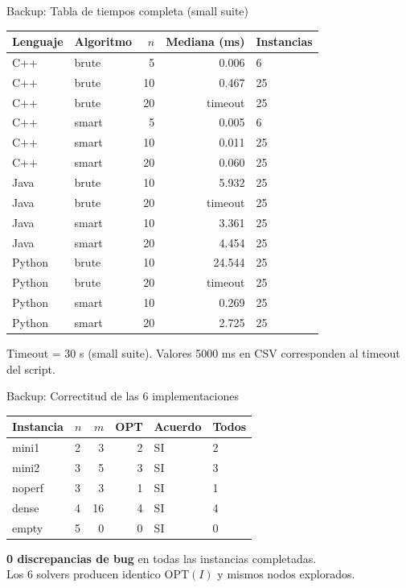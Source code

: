 \appendix

\begin{frame}{Backup: Tabla de tiempos completa (small suite)}

\begin{center}
\footnotesize
\begin{tabular}{llrrl}
\toprule
Lenguaje & Algoritmo & $n$ & Mediana (ms) & Instancias \\
\midrule
C++     & brute & 5  & 0.006   & 6 \\
C++     & brute & 10 & 0.467   & 25 \\
C++     & brute & 20 & timeout & 25 \\
C++     & smart & 5  & 0.005   & 6 \\
C++     & smart & 10 & 0.011   & 25 \\
C++     & smart & 20 & 0.060   & 25 \\
\midrule
Java    & brute & 10 & 5.932   & 25 \\
Java    & brute & 20 & timeout & 25 \\
Java    & smart & 10 & 3.361   & 25 \\
Java    & smart & 20 & 4.454   & 25 \\
\midrule
Python  & brute & 10 & 24.544  & 25 \\
Python  & brute & 20 & timeout & 25 \\
Python  & smart & 10 & 0.269   & 25 \\
Python  & smart & 20 & 2.725   & 25 \\
\bottomrule
\end{tabular}
\end{center}

{\small Timeout = 30 s (small suite). Valores 5000 ms en CSV corresponden al timeout del script.}

\end{frame}

\begin{frame}{Backup: Correctitud de las 6 implementaciones}

\begin{center}
\begin{tabular}{llrrll}
\toprule
Instancia & $n$ & $m$ & OPT & Acuerdo & Todos \\
\midrule
mini1   & 2 & 3  & 2 & SI & 2 \\
mini2   & 3 & 5  & 3 & SI & 3 \\
noperf  & 3 & 3  & 1 & SI & 1 \\
dense   & 4 & 16 & 4 & SI & 4 \\
empty   & 5 & 0  & 0 & SI & 0 \\
\bottomrule
\end{tabular}
\end{center}

\medskip
\textbf{0 discrepancias de bug} en todas las instancias completadas.\\
Los 6 solvers producen identico $\mathrm{OPT}(I)$ y mismos nodos explorados.

\end{frame}

